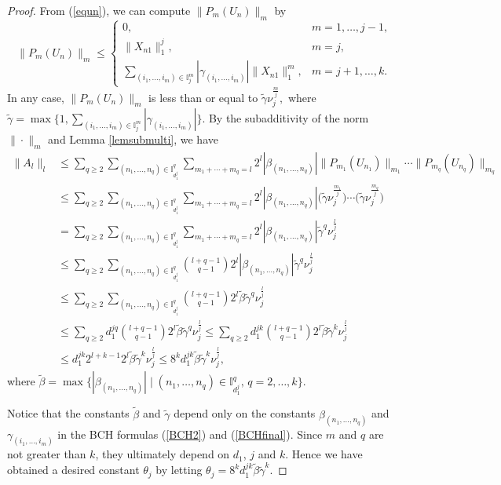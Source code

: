 \documentclass[10pt,a4paper]{amsart}
\numberwithin{equation}{section}
\begin{document}
\begin{proof}
From (\ref{equn}),
we can compute $\|P_m(U_n)\|_m$ by
\[
\|P_m(U_n)\|_m\leq\begin{cases}
 0, & m=1,\dots,j-1,\\
\|X_{n1}\|_1^j, & m=j,\\
\sum_{(i_1,\dots,i_m)\in\mathbb{I}_j^m}|\gamma_{(i_1,\dots,i_m)}|
\|X_{n1}\|_1^m, & m=j+1,\dots,k.
\end{cases}
\]
In any case,
$\|P_m(U_n)\|_m$ is less than or equal to $\tilde{\gamma}\nu_j^{\frac{m}{j}},$
where $\tilde{\gamma}\!=\!\max\big\{1,\sum_{(i_1,\dots,i_m)\in \mathbb{I}_j^m}\!|\gamma_{(i_1,\dots,i_m)}|\big\}$.
By the subadditivity of the norm $\|\cdot\|_m$ and Lemma \ref{lemsubmulti},
we have
\begin{align*}
 \|A_l\|_l&\leq\sum_{q\geq2}\sum_{(n_1,\dots,n_{q})\in\mathbb{I}_{d_1^j}^q}\sum_{m_1+\cdots+m_q=l}2^l  |\beta_{(n_1,\dots,n_q)}|  \|P_{m_1}(U_{n_1})\|_{m_1}\cdots\|P_{m_q}(U_{n_q})\|_{m_q}
 \\
 &\leq \sum_{q\geq2}\sum_{(n_1,\dots,n_q)\in \mathbb{I}_{d_1^j}^q}\sum_{m_1+\cdots+m_q=l}2^l  |\beta_{(n_1,\dots,n_q)}| \big(\tilde{\gamma}\nu_j^{\frac{m_1}{j}}\big)\cdots \big(\tilde{\gamma}\nu_j^{\frac{m_q}{j}}\big)
 \\
 &= \sum_{q\geq2}\sum_{(n_1,\dots,n_q)\in \mathbb{I}_{d_1^j}^q}\sum_{m_1+\cdots+m_q=l} 2^l  |\beta_{(n_1,\dots,n_q)}|  \tilde{\gamma}^q  \nu_j^{\frac{l}{j}}
 \\
 &\leq \sum_{q\geq2}\sum_{(n_1,\dots,n_q)\in \mathbb{I}_{d_1^j}^q}\binom{l+q-1}{q-1}   2^l  |\beta_{(n_1,\dots,n_q)}|  \tilde{\gamma}^q  \nu_j^{\frac{l}{j}}
 \\
 &\leq\sum_{q\geq2}\sum_{(n_1,\dots,n_q)\in \mathbb{I}_{d_1^j}^q} \binom{l+q-1}{q-1}  2^l  \tilde{\beta}  \tilde{\gamma}^q  \nu_j^{\frac{l}{j}}
 \\
 &\leq\sum_{q\geq2}d_1^{jq}  \binom{l+q-1}{q-1}  2^l  \tilde{\beta}  \tilde{\gamma}^q  \nu_j^{\frac{l}{j}}
 \leq\sum_{q\geq2}d_1^{jk}  \binom{l+q-1}{q-1}  2^l  \tilde{\beta}  \tilde{\gamma}^k  \nu_j^{\frac{l}{j}}
 \\
 &\leq d_1^{jk}  2^{l+k-1}  2^l  \tilde{\beta}  \tilde{\gamma}^k  \nu_j^{\frac{l}{j}}
 \leq 8^k  d_1^{jk} \tilde{\beta}  \tilde{\gamma}^k  \nu_j^{\frac{l}{j}},
\end{align*}
where $\tilde{\beta}=\max\big\{|\beta_{(n_1,\dots,n_q)}|\mid (n_1,\dots,n_q)\in \mathbb{I}_{d_1^j}^q,\,q=2,\dots,k\big\}$.

Notice that the constants $\tilde{\beta}$ and $\tilde{\gamma}$ depend only on the constants $\beta_{(n_1,\dots,n_q)}$ and $\gamma_{(i_1,\dots,i_m)}$ in the BCH formulas (\ref{BCH2}) and (\ref{BCHfinal}).
Since $m$ and $q$ are not greater than $k$,
they ultimately depend on $d_1$, $j$ and $k$.
Hence we have obtained a desired constant $\theta_j$ by letting
$\theta_j=8^kd_1^{jk}\tilde{\beta}\tilde{\gamma}^k.$
\end{proof}
\end{document}
